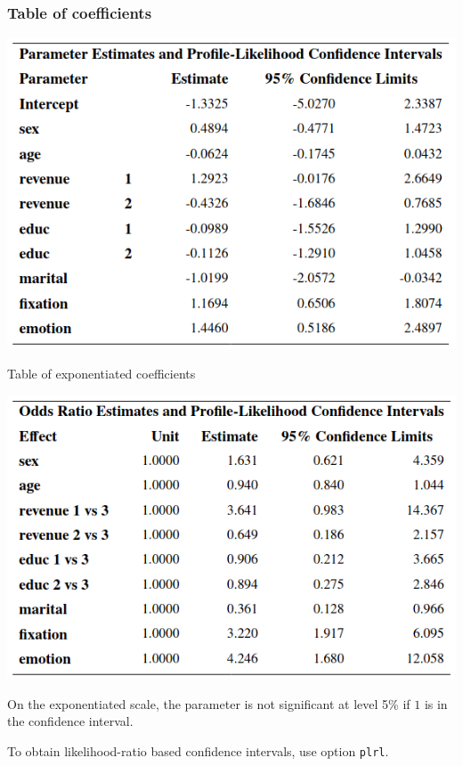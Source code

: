 \documentclass{beamer}
\begin{document}
\begin{frame}
 \frametitle{Table of coefficients}
 \begin{center}
\includegraphics[width = 0.8\linewidth]{img/c4/slides8-e14.png}
\end{center}
\end{frame}
\begin{frame}{Table of exponentiated coefficients}
\begin{center}
 \includegraphics[width = 0.8\linewidth]{img/c4/slides8-e15.png}
\end{center}
\begin{footnotesize}
 \bi 
 \item On the exponentiated scale, the parameter is not significant at level 5\% if $1$ is in the confidence interval.
 \item To obtain likelihood-ratio based confidence intervals, use option \texttt{plrl}.
 \ei
\end{footnotesize}




\end{frame}
\end{document}
